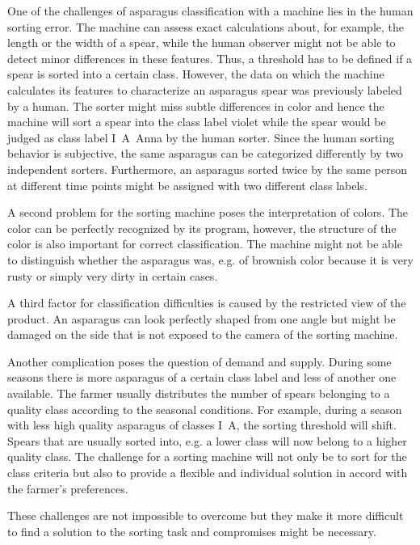 \bigskip
One of the challenges of asparagus classification with a machine lies in the human sorting error. The machine can assess exact calculations about, for example, the length or the width of a spear, while the human observer might not be able to detect minor differences in these features. Thus, a threshold has to be defined if a spear is sorted into a certain class. However, the data on which the machine calculates its features to characterize an asparagus spear was previously labeled by a human. The sorter might miss subtle differences in color and hence the machine will sort a spear into the class label violet while the spear would be judged as class label I~A~Anna by the human sorter. Since the human sorting behavior is subjective, the same asparagus can be categorized differently by two independent sorters. Furthermore, an asparagus sorted twice by the same person at different time points might be assigned with two different class labels.

A second problem for the sorting machine poses the interpretation of colors. The color can be perfectly recognized by its program, however, the structure of the color is also important for correct classification. The machine might not be able to distinguish whether the asparagus was, e.g. of brownish color because it is very rusty or simply very dirty in certain cases.

A third factor for classification difficulties is caused by the restricted view of the product. An asparagus can look perfectly shaped from one angle but might be damaged on the side that is not exposed to the camera of the sorting machine.

Another complication poses the question of demand and supply. During some seasons there is more asparagus of a certain class label and less of another one available. The farmer usually distributes the number of spears belonging to a quality class according to the seasonal conditions. For example, during a season with less high quality asparagus of classes I~A, the sorting threshold will shift. Spears that are usually sorted into, e.g. a lower class will now belong to a higher quality class. The challenge for a sorting machine will not only be to sort for the class criteria but also to provide a flexible and individual solution in accord with the farmer’s preferences.

These challenges are not impossible to overcome but they make it more difficult to find a solution to the sorting task and compromises might be necessary. 
